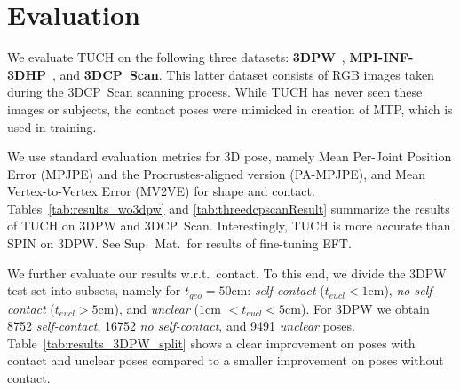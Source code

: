 \documentclass[final]{cvpr}
\newcommand{\suppmat}{Sup.~Mat.\xspace}
\newcommand{\threedcpscan}{\mbox{3DCP Scan}\xspace}
\newcommand{\threedpw}{\mbox{3DPW}\xspace}
\theoremstyle{definition}
\begin{document}
\section{Evaluation}
\begin{table}[t]
	\centering
	\caption{Evaluation on \threedcpscan.
	Numbers are in \emph{mm}. Note that in contrast to TUCH, this version of SPIN did not see poses in the MTP dataset during training. Please see Table \ref{tab:ablation_study} and the corresponding text for an ablation study.}
	\label{tab:threedcpscanResult}
\end{table}
We  evaluate TUCH  on the following three datasets:
\textbf{3DPW}~\cite{vonMarcard2018}, \textbf{MPI-INF-3DHP}~\cite{mono-3dhp2017},
and \textbf{\threedcpscan}. 
This latter dataset consists of RGB images taken during the \threedcpscan scanning process.
While TUCH has never seen these images or subjects, the contact poses were mimicked in creation of MTP, which is used in training.

We use standard evaluation metrics for 3D pose, namely Mean Per-Joint
Position Error (MPJPE) and the Procrustes-aligned version (PA-MPJPE),
and Mean Vertex-to-Vertex Error (MV2VE) for shape and contact. 
Tables~\ref{tab:results_wo3dpw} and \ref{tab:threedcpscanResult} summarize the results of TUCH on \threedpw and \threedcpscan.
Interestingly, TUCH is more accurate than SPIN on 3DPW.
See \suppmat~for results of fine-tuning EFT.

We further evaluate our results w.r.t.~contact. 
To this end, we divide the 3DPW test set into subsets, namely for
$t_{geo} = 50$cm: \textit{self-contact} ($t_{eucl} < 1$cm), \textit{no
  self-contact} ($t_{eucl} > 5$cm), and \textit{unclear} ($ 1$cm $ <
t_{eucl} < 5$cm). For 3DPW we obtain 8752 \textit{self-contact}, 16752
\textit{no self-contact}, and 9491 \textit{unclear} poses. 
Table~\ref{tab:results_3DPW_split} shows a clear improvement on poses
with contact and unclear poses compared to a smaller improvement on
poses without contact.
\end{document}
